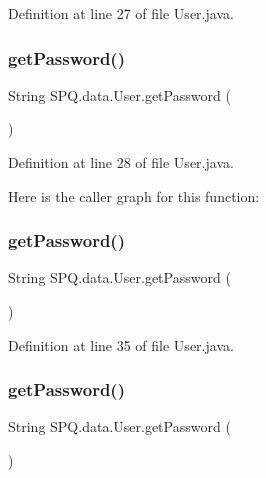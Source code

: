 Definition at line 27 of file User.\+java.

\mbox{\label{class_s_p_q_1_1data_1_1_user_a688c1eadd21594d52967d87289e23ce2}} 
\subsubsection{\texorpdfstring{get\+Password()}{getPassword()}\hspace{0.1cm}{\footnotesize\ttfamily [2/4]}}
{\footnotesize\ttfamily String S\+P\+Q.\+data.\+User.\+get\+Password (\begin{DoxyParamCaption}{ }\end{DoxyParamCaption})}



Definition at line 28 of file User.\+java.

Here is the caller graph for this function\+:
\mbox{\label{class_s_p_q_1_1data_1_1_user_a688c1eadd21594d52967d87289e23ce2}} 
\subsubsection{\texorpdfstring{get\+Password()}{getPassword()}\hspace{0.1cm}{\footnotesize\ttfamily [3/4]}}
{\footnotesize\ttfamily String S\+P\+Q.\+data.\+User.\+get\+Password (\begin{DoxyParamCaption}{ }\end{DoxyParamCaption})}



Definition at line 35 of file User.\+java.

\mbox{\label{class_s_p_q_1_1data_1_1_user_a688c1eadd21594d52967d87289e23ce2}} 
\subsubsection{\texorpdfstring{get\+Password()}{getPassword()}\hspace{0.1cm}{\footnotesize\ttfamily [4/4]}}
{\footnotesize\ttfamily String S\+P\+Q.\+data.\+User.\+get\+Password (\begin{DoxyParamCaption}{ }\end{DoxyParamCaption})}



